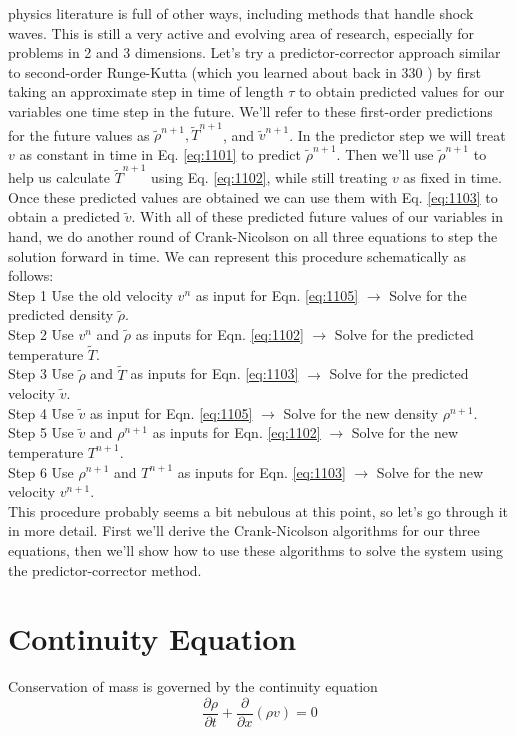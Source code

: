physics literature is full of other ways, including methods that handle shock waves.
This is still a very active and evolving area of research, especially for problems in
2 and 3 dimensions.
Let\rq s try a predictor-corrector approach similar to second-order Runge-Kutta (which you learned about back in 330 ) by first taking an approximate step in time of length $\tau$ to obtain predicted values for our variables one time step in the future. We'll refer to these first-order predictions for the future values as $\tilde{\rho}^{n+1}, \tilde{T}^{n+1}$, and $\tilde{v}^{n+1}$. In the predictor step we will treat $v$ as constant in time in Eq. \ref{eq:1101} to predict $\tilde{\rho}^{n+1}$. Then we'll use $\tilde{\rho}^{n+1}$ to help us calculate $\tilde{T}^{n+1}$ using Eq. \ref{eq:1102}, while still treating $v$ as fixed in time. Once these predicted values are obtained we can use them with Eq. \ref{eq:1103} to obtain a predicted $\tilde{v}$. With all of these predicted future values of our variables in hand, we do another round of Crank-Nicolson on all three equations to step the solution forward in time. We can represent this procedure schematically as follows:\\
Step 1 Use the old velocity $v^{n}$ as input for Eqn. \ref{eq:1105} $\rightarrow$ Solve for the predicted density $\tilde{\rho}$.\\
Step 2 Use $v^{n}$ and $\tilde{\rho}$ as inputs for Eqn. \ref{eq:1102} $\rightarrow$ Solve for the predicted temperature $\tilde{T}$.\\
Step 3 Use $\tilde{\rho}$ and $\tilde{T}$ as inputs for Eqn. \ref{eq:1103} $\rightarrow$ Solve for the predicted velocity $\tilde{v}$.\\
Step 4 Use $\tilde{v}$ as input for Eqn. \ref{eq:1105} $\rightarrow$ Solve for the new density $\rho^{n+1}$.\\
Step 5 Use $\tilde{v}$ and $\rho^{n+1}$ as inputs for Eqn. \ref{eq:1102} $\rightarrow$ Solve for the new temperature $T^{n+1}$.\\
Step 6 Use $\rho^{n+1}$ and $T^{n+1}$ as inputs for Eqn. \ref{eq:1103} $\rightarrow$ Solve for the new velocity $v^{n+1}$.\\

This procedure probably seems a bit nebulous at this point, so let\rq s go through it in more detail. First we\rq ll derive the Crank-Nicolson algorithms for our three equations, then we\rq ll show how to use these algorithms to solve the system using the predictor-corrector method.


\section*{Continuity Equation}
Conservation of mass is governed by the continuity equation
\begin{equation}\label{eq:1105}
\frac{\partial \rho}{\partial t}+\frac{\partial}{\partial x}(\rho v)=0
\end{equation}

